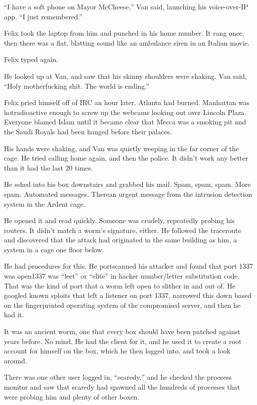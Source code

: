 “I have a soft phone on Mayor McCheese,” Van said, launching his
voice-over-IP app. “I just remembered.”

Felix took the laptop from him and punched in his home number. It
rang once, then there was a flat, blatting sound like an ambulance
siren in an Italian movie.

Felix typed again.

He looked up at Van, and saw that his skinny shoulders were
shaking. Van said, “Holy motherfucking shit. The world is ending.”

\tb

Felix pried himself off of IRC an hour later. Atlanta had burned.
Manhattan was hot\dash{}radioactive enough to screw up the webcams
looking out over Lincoln Plaza. Everyone blamed Islam until it
became clear that Mecca was a smoking pit and the Saudi Royals had
been hanged before their palaces.

His hands were shaking, and Van was quietly weeping in the far
corner of the cage. He tried calling home again, and then the
police. It didn’t work any better than it had the last 20 times.

He sshed into his box downstairs and grabbed his mail. Spam, spam,
spam. More spam. Automated messages. There\dash{}an urgent message from
the intrusion detection system in the Ardent cage.

He opened it and read quickly. Someone was crudely, repeatedly
probing his routers. It didn’t match a worm’s signature, either. He
followed the traceroute and discovered that the attack had
originated in the same building as him, a system in a cage one
floor below.

He had procedures for this. He portscanned his attacker and found
that port 1337 was open\dash{}1337 was “leet” or “elite” in hacker
number/letter substitution code. That was the kind of port that a
worm left open to slither in and out of. He googled known sploits
that left a listener on port 1337, narrowed this down based on the
fingerprinted operating system of the compromised server, and then
he had it.

It was an ancient worm, one that every box should have been patched
against years before. No mind. He had the client for it, and he
used it to create a root account for himself on the box, which he
then logged into, and took a look around.

There was one other user logged in, “scaredy,” and he checked the
proccess monitor and saw that scaredy had spawned all the hundreds
of processes that were probing him and plenty of other boxen.

